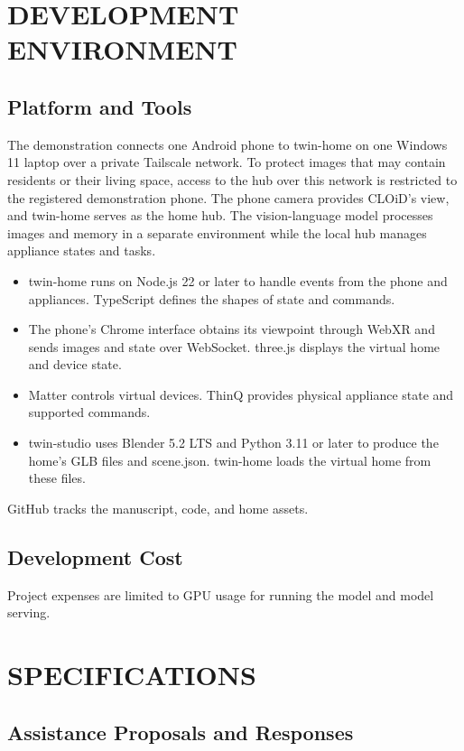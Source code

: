\documentclass[conference,a4paper]{IEEEtran}
\begin{document}
\section{DEVELOPMENT ENVIRONMENT}

\subsection{Platform and Tools}

The demonstration connects one Android phone to twin-home on one Windows 11 laptop over a private Tailscale network. To protect images that may contain residents or their living space, access to the hub over this network is restricted to the registered demonstration phone. The phone camera provides CLOiD's view, and twin-home serves as the home hub. The vision-language model processes images and memory in a separate environment while the local hub manages appliance states and tasks.

\begin{itemize}
\item twin-home runs on Node.js 22 or later to handle events from the phone and appliances. TypeScript defines the shapes of state and commands.
\item The phone's Chrome interface obtains its viewpoint through WebXR and sends images and state over WebSocket. three.js displays the virtual home and device state.
\item Matter controls virtual devices. ThinQ provides physical appliance state and supported commands.
\item twin-studio uses Blender 5.2 LTS and Python 3.11 or later to produce the home's GLB files and scene.json. twin-home loads the virtual home from these files.
\end{itemize}

GitHub tracks the manuscript, code, and home assets.

\subsection{Development Cost}

Project expenses are limited to GPU usage for running the model and model serving.

\section{SPECIFICATIONS}

\subsection{Assistance Proposals and Responses}
\end{document}
